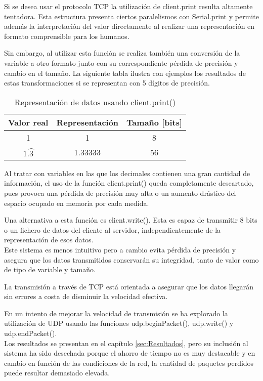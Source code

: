 Si se desea usar el protocolo TCP la utilización de client.print resulta altamente tentadora. Esta estructura presenta ciertos paralelismos con Serial.print y permite además la interpretación del valor directamente al realizar una representación en formato comprensible para los humanos.
 
Sin embargo, al utilizar esta función se realiza también una conversión de la variable a otro formato junto con su correspondiente pérdida de precisión y cambio en el tamaño. La siguiente tabla ilustra con ejemplos los resultados de estas transformaciones si se representan con 5 dígitos de precisión.
\begin{table} [H]
	\centering
	\begin{tabular}{|c|c|c|}
\hline 
\textbf{Valor real} & \textbf{Representación} & \textbf{Tamaño [bits]} \\ 
\hline 
1 & 1 & 8 \\ 
\hline 
$1.\wideparen{3}$ & 1.33333 & 56\footnotemark \\ 
\hline 
	\end{tabular} 
	\caption{Representación de datos usando client.print()}
	\label{tab:client_print_rep}
\end{table}

Al tratar con variables en las que los decimales contienen una gran cantidad de información, el uso de la función client.print() queda completamente descartado, pues provoca una pérdida de precisión muy alta o un aumento drástico del espacio ocupado en memoria por cada medida.

Una alternativa a esta función es client.write(). Esta es capaz de transmitir 8 bits o un fichero de datos del cliente al servidor, independientemente de la representación de esos datos.\\
Este sistema es menos intuitivo pero a cambio evita pérdida de precisión y asegura que los datos transmitidos conservarán su integridad, tanto de valor como de tipo de variable y tamaño.

La transmisión a través de TCP está orientada a asegurar que los datos llegarán sin errores a costa de disminuir la velocidad efectiva. 

En un intento de mejorar la velocidad de transmisión se ha explorado la utilización de UDP usando las funciones udp.beginPacket(), udp.write() y udp.endPacket().\\
Los resultados se presentan en el capítulo \ref{sec:Resultados}, pero su inclusión al sistema ha sido desechada porque el ahorro de tiempo no es muy destacable y en cambio en función de las condiciones de la red, la cantidad de paquetes perdidos puede resultar demasiado elevada.

